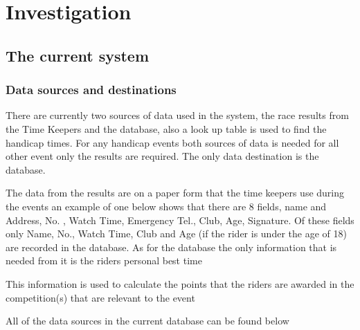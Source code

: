 


\section{Investigation}

\subsection{The current system}

\subsubsection{Data sources and destinations}
There are currently two sources of data used in the system, the race results from the Time Keepers and the database, also a look up table is used to find the handicap times. For any handicap events both sources of data is needed for all other event only the results are required. The only data destination is the database.

The data from the results are on a paper form that the time keepers use during the events an example of one below shows that there are 8 fields, name and Address, No. , Watch Time, Emergency Tel., Club, Age, Signature. Of these fields only Name, No., Watch Time, Club and Age (if the rider is under the age of 18) are recorded in the database. As for the database the only information that is needed from it is the riders personal best time

This information is used to calculate the points that the riders are awarded in the competition(s) that are relevant to the event

All of the data sources in the current database can be found below

